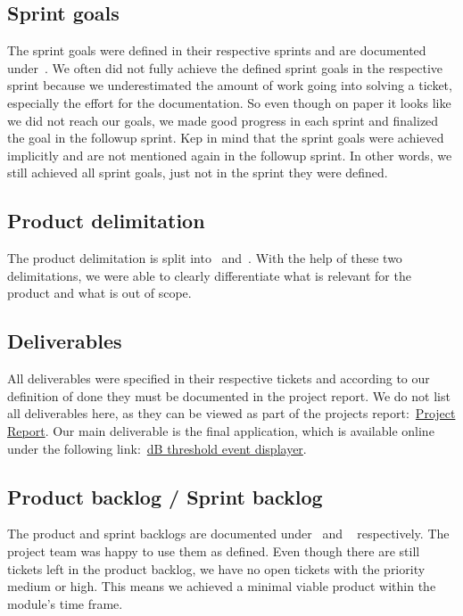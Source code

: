 \subsection{Sprint goals}\label{subsec:sprint-goals-review}
The sprint goals were defined in their respective sprints and are documented under~.
We often did not fully achieve the defined sprint goals in the respective sprint
because we underestimated the amount of work going into solving a ticket, especially the effort for the documentation.
So even though on paper it looks like we did not reach our goals, we made good progress in each sprint and finalized the
goal in the followup sprint. Kep in mind that the sprint goals were achieved implicitly and are not mentioned again
in the followup sprint.
In other words, we still achieved all sprint goals, just not in the sprint they were defined.

\subsection{Product delimitation}\label{subsec:product-delimination-review}
The product delimitation is split into~ and~.
With the help of these two delimitations, we were able to clearly differentiate what is relevant for the product and what is out of scope.

\subsection{Deliverables}\label{subsec:deliverables-review}
All deliverables were specified in their respective tickets and according to our definition of done they must be documented in the project report.
We do not list all deliverables here, as they can be viewed as part of the projects report:~\href{https://gitlab.ti.bfh.ch/decibel-threshold-event-displayer/decibel-threshold-event-displayer/-/raw/main/doc/report/report.pdf}{Project Report}.
Our main deliverable is the final application, which is available online under the following link:~\href{https://decibel-threshold-event-displayer.github.io/#/}{dB threshold event displayer}.

\subsection{Product backlog / Sprint backlog}\label{subsec:backlogs-review}
The product and sprint backlogs are documented under~ and ~ respectively.
The project team was happy to use them as defined. Even though there are still tickets left in the product backlog,
we have no open tickets with the priority medium or high. This means we achieved a minimal viable product within the module's time frame.
